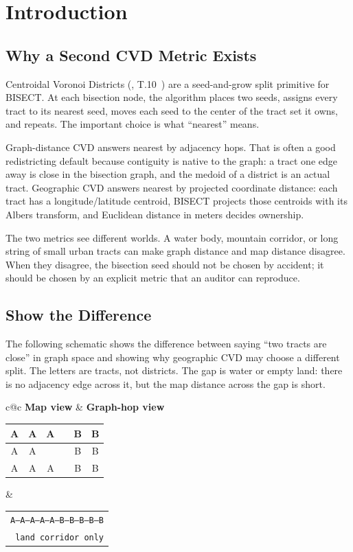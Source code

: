 \section{Introduction}
\label{sec:introduction}

\subsection{Why a Second CVD Metric Exists}

Centroidal Voronoi Districts (\cvd{}, T.10~\citep{dellaLibera2026cvd}) are a
seed-and-grow split primitive for BISECT. At each bisection node, the algorithm
places two seeds, assigns every tract to its nearest seed, moves each seed to
the center of the tract set it owns, and repeats. The important choice is what
``nearest'' means.

Graph-distance CVD answers nearest by adjacency hops. That is often a good
redistricting default because contiguity is native to the graph: a tract one
edge away is close in the bisection graph, and the medoid of a district is an
actual tract. Geographic CVD answers nearest by projected coordinate distance:
each tract has a longitude/latitude centroid, BISECT projects those centroids
with its Albers transform, and Euclidean distance in meters decides ownership.

The two metrics see different worlds. A water body, mountain corridor, or long
string of small urban tracts can make graph distance and map distance disagree.
When they disagree, the bisection seed should not be chosen by accident; it
should be chosen by an explicit metric that an auditor can reproduce.

\subsection{Show the Difference}

The following schematic shows the difference between saying ``two tracts are
close'' in graph space and showing why geographic CVD may choose a different
split. The letters are tracts, not districts. The gap is water or empty land:
there is no adjacency edge across it, but the map distance across the gap is
short.

\begin{center}
\begin{tabular}{c@{\qquad}c}
\textbf{Map view} & \textbf{Graph-hop view} \\
\begin{tabular}{|c|c|c|c|c|c|}
\hline
A & A & A &   & B & B \\ \hline
A & A &   &   & B & B \\ \hline
A & A & A &   & B & B \\ \hline
\end{tabular}
&
\begin{tabular}{c}
\texttt{A--A--A--A--A--B--B--B--B--B}\\
\texttt{        land corridor only}
\end{tabular}
\end{tabular}
\end{center}

